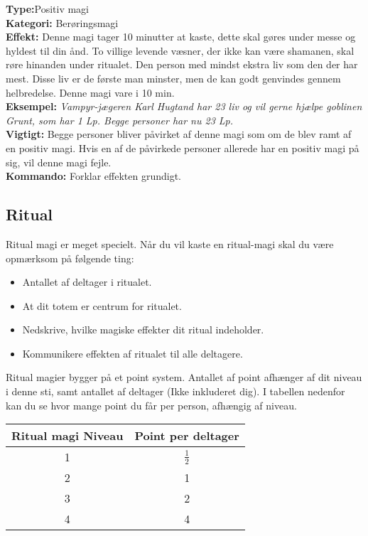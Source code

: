 \begin{åndens gave*}
\textbf{Type:}Positiv magi \\
\textbf{Kategori:} Berøringsmagi\\
\textbf{Effekt:} Denne magi tager 10 minutter at kaste, dette skal gøres under messe og hyldest til din ånd. To villige levende væsner, der ikke kan være shamanen, skal røre hinanden under ritualet. Den person med mindst ekstra liv som den der har mest. Disse liv er de første man minster, men de kan godt genvindes gennem helbredelse. Denne magi vare i 10 min.\\
\textbf{Eksempel:} \textit{Vampyr-jægeren Karl Hugtand har 23 liv og vil gerne hjælpe goblinen Grunt, som har 1
Lp. Begge personer har nu 23 Lp.}\\
\textbf{Vigtigt:} Begge personer bliver påvirket af denne magi som om de blev ramt af en positiv magi. Hvis en af de påvirkede personer allerede har en positiv magi på sig, vil denne magi fejle.\\
\textbf{Kommando:} Forklar effekten grundigt.
\end{åndens gave*}

\subsection*{Ritual}

Ritual magi er meget specielt. Når du vil kaste en ritual-magi skal du være opmærksom på følgende ting:
\begin{itemize}
    \item Antallet af deltager i ritualet.
    \item At dit totem er centrum for ritualet.
    \item Nedskrive, hvilke magiske effekter dit ritual indeholder.
    \item Kommunikere effekten af ritualet til alle deltagere.
\end{itemize}

Ritual magier bygger på et point system. Antallet af point afhænger af dit niveau i denne sti, samt antallet af deltager (Ikke inkluderet dig). I tabellen nedenfor kan du se hvor mange point du får per person, afhængig af niveau.
\begin{table}[H]
    \centering
    \begin{tabular}{|c|c|}
    \rowcolor{cerulean!80}\hline
        Ritual magi Niveau & Point per deltager \\\hline
        1&$\frac{1}{2}$\\\hline
        2&1\\\hline
        3&2\\\hline
        4&4\\\hline
    \end{tabular}
\end{table}


